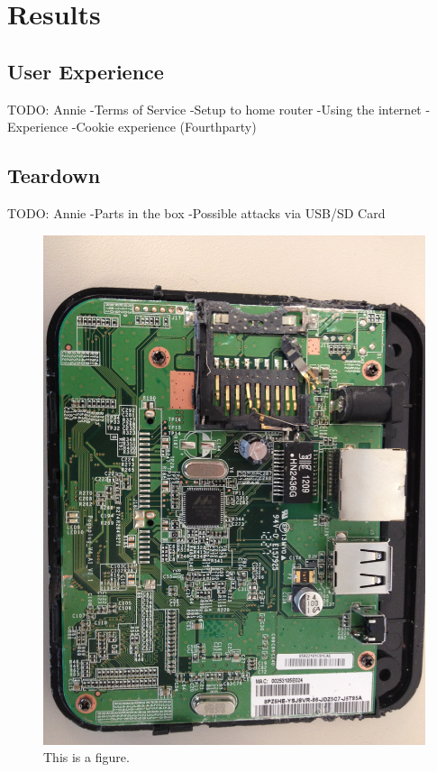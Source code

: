 \section{Results}
\label{sec:results}
\subsection{User Experience}
\label{sec:ux}
TODO: Annie
    -Terms of Service
    -Setup to home router
    -Using the internet
    -Experience
    -Cookie experience (Fourthparty)

\subsection{Teardown}
\label{sec:tear}
TODO: Annie
    -Parts in the box
    -Possible attacks via USB/SD Card

\begin{figure}[htb]
\begin{center}
\includegraphics[width=\linewidth]{safeplug_top}
\caption{This is a figure.}
\end{center}
\end{figure}

